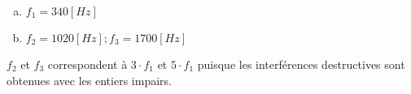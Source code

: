 %
%
    \begin{enumerate}[a)]
        \item \(f_1=340[Hz]\)
        \item \(f_2=1020[Hz] ; f_3=1700[Hz]\)
    \end{enumerate}
    \(f_2\) et \(f_3\) correspondent à \(3 \cdot f_1\) et \(5 \cdot f_1\) puisque les interférences destructives sont obtenues avec les entiers impairs.
